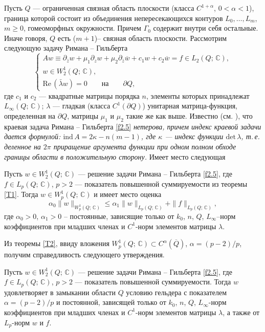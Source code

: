 Пусть $Q$ --- ограниченная связная область плоскости (класса $C^{1+\alpha}$, $0<\alpha<1$), граница которой %
состоит из объединения непересекающихся контуров $L_0,\dots, L_m$, $ m\geqslant0$, гомеоморфных окружности. %
Причем $ \Gamma_0$ содержит внутри себя остальные. Иначе говоря, $Q$ есть ($m+1$)--%
связная область плоскости. Рассмотрим следующую задачу Римана -- Гильберта
\begin{equation}\label{f2.5}
\begin{cases}
Aw \equiv \partial _{\bar z} w+\mu_1 \partial _z w+\mu _2 \partial _{\bar z}
\overline w+ c_1 w+ c_2 \overline w=f\in L_2(Q;\,\mathbb C), \\
w\in W^1_2(Q;\,\mathbb C), \\
 \text{Re}\,(\bar \lambda w)=0 \qquad \text{на} \qquad \partial Q,
\end{cases}
\end{equation}
где $c_1$ и $c_2$ --- квадратные матрицы порядка $n$, элементы которых принадлежат
$L_\infty(Q;\,\mathbb C)$; $\lambda $ --- гладкая (класса %
$C^1(\partial Q)$) унитарная матрица-функция, определенная на $\partial Q$,
матрицы $\mu_1$ и $\mu_2$ такие же как выше.
Известно (см. \cite{9}), что краевая задача Римана -- Гильберта \eqref{f2.5} \textit {нетерова, причем индекс краевой задачи дается формулой:
$\mathrm{ind}\,A=2\kappa-n(m-1)$, где $\kappa$ --- индекс функции $\mathrm{det}\,\lambda$, т.\,е. деленное на $2\pi$ приращение аргумента функции при одном полном обходе  границы области в положительную сторону.}
Имеет место следующая
\begin{theorem}\label{T2}
Пусть $w\in W^1_2(Q;\,\mathbb C)$ --- решение
задачи Римана -- Гильберта \eqref{f2.5}, где $f\in { L_p}(Q;\,\mathbb C)$, $p>2$ --- показатель
повышенной суммируемости из теоремы \ref{T1}. Тогда
$w\in W^1_p(Q;\,\mathbb C)$ и имеет место оценка
\begin{equation}\label{fd.13}
\alpha_0\|w\|_{W^1_p(Q;\,\mathbb C)}\leqslant \alpha_1
\|w\|_{L_p(Q;\,\mathbb C)}+\|f\|_{L_p(Q;\,\mathbb C)},
\end{equation}
где $\alpha_0>0$, $\alpha_1>0$ -- постоянные, зависящие
только от  $k_0$, $n$, $Q$, $L_{\infty}$\!--норм коэффициентов при
младших членах и $C^1$\!-норм
элементов матрицы $\lambda$.
\end{theorem}

Из теоремы \ref{T2}, ввиду вложения $W^1_p(Q;\,
\mathbb{C})\subset C^\alpha(\overline{Q})$, $\alpha=(p-2)/p$, получим справедливость
следующего утверждения.
\begin{theorem} Пусть $w\in W^1_2(Q;\,\mathbb C)$ --- решение %
задачи Римана -- Гильберта \eqref{f2.5}, где $f\in { L_p}(Q;\,\mathbb C)$,  $p>2$ --- показатель
повышенной суммируемости. Тогда %
$w$ удовлетворяет в замыкании области $Q$ условию гельдера с показателем
$\alpha=(p-2)/p$ и
постоянной, зависящей только от $k_0$, $n$, $Q$, $ L_\infty$\!-норм коэффициентов при младших членах и $C^1$\!-норм %
элементов матрицы $\lambda$,
а также от $L_p$\!-норм $w$ и $f$.
\end{theorem}

